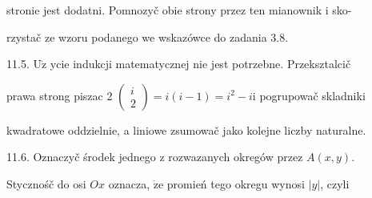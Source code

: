 \documentclass[a4paper,12pt]{article}
\begin{document}
stronie jest dodatni. Pomnozyč obie strony przez ten mianownik $\mathrm{i}$ sko-

rzystač ze wzoru podanego we wskazówce do zadania 3.8.

11.5. $\mathrm{U}\dot{\mathrm{z}}$ ycie indukcji matematycznej nie jest potrzebne. Przeksztalcič

prawa strong piszac 2 $\left(\begin{array}{l}
i\\
2
\end{array}\right) = i(i-1) = i^{2}-i \mathrm{i}$ pogrupowač skladniki

kwadratowe oddzielnie, a liniowe zsumowač jako kolejne liczby naturalne.

11.6. Oznaczyč środek jednego $\mathrm{z}$ rozwazanych okregów przez $A(x,y).$

Stycznośč do osi $Ox$ oznacza, $\dot{\mathrm{z}}\mathrm{e}$ promień tego okregu wynosi $|y|$, czyli
\end{document}
